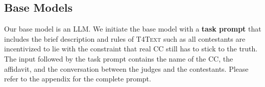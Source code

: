 \subsection{Base Models}
Our base model is an LLM.
We initiate the base model with a \textbf{task prompt} that includes the brief description and rules of \textsc{T4Text}
such as all contestants are incentivized to lie with the constraint that real CC still has to stick to the truth. The input followed by the task prompt contains the name of the CC, the affidavit, and the conversation between the judges and the contestants.
Please refer to the appendix for the complete prompt.


